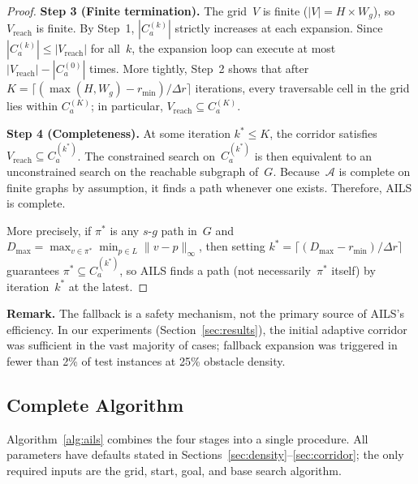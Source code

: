 \documentclass[journal]{IEEEtran}
\begin{document}
\begin{proof}
\noindent\textbf{Step 3 (Finite termination).}
The grid~$V$ is finite ($|V| = H \times W_g$), so $V_{\mathrm{reach}}$ is finite.
By Step~1, $|C_a^{(k)}|$ strictly increases at each expansion.
Since $|C_a^{(k)}| \leq |V_{\mathrm{reach}}|$ for all~$k$, the expansion loop can execute at most $|V_{\mathrm{reach}}| - |C_a^{(0)}|$ times.
More tightly, Step~2 shows that after $K = \lceil (\max(H, W_g) - r_{\min}) / \Delta r \rceil$ iterations, every traversable cell in the grid lies within $C_a^{(K)}$; in particular, $V_{\mathrm{reach}} \subseteq C_a^{(K)}$.

\noindent\textbf{Step 4 (Completeness).}
At some iteration $k^{*} \leq K$, the corridor satisfies $V_{\mathrm{reach}} \subseteq C_a^{(k^{*})}$.
The constrained search on~$C_a^{(k^{*})}$ is then equivalent to an unconstrained search on the reachable subgraph of~$G$.
Because~$\mathcal{A}$ is complete on finite graphs by assumption, it finds a path whenever one exists.
Therefore, AILS is complete.

More precisely, if $\pi^{*}$ is any $s$-$g$ path in~$G$ and $D_{\max} = \max_{v \in \pi^{*}} \min_{p \in L}\|v-p\|_{\infty}$, then setting $k^{*} = \lceil (D_{\max} - r_{\min}) / \Delta r \rceil$ guarantees $\pi^{*} \subseteq C_a^{(k^{*})}$, so AILS finds a path (not necessarily~$\pi^{*}$ itself) by iteration~$k^{*}$ at the latest.
\end{proof}

\noindent
\textbf{Remark.}
The fallback is a safety mechanism, not the primary source of AILS's efficiency.
In our experiments (Section~\ref{sec:results}), the initial adaptive corridor was sufficient in the vast majority of cases; fallback expansion was triggered in fewer than 2\% of test instances at 25\% obstacle density.

\subsection{Complete Algorithm}

Algorithm~\ref{alg:ails} combines the four stages into a single procedure.
All parameters have defaults stated in Sections~\ref{sec:density}--\ref{sec:corridor}; the only required inputs are the grid, start, goal, and base search algorithm.
\end{document}
